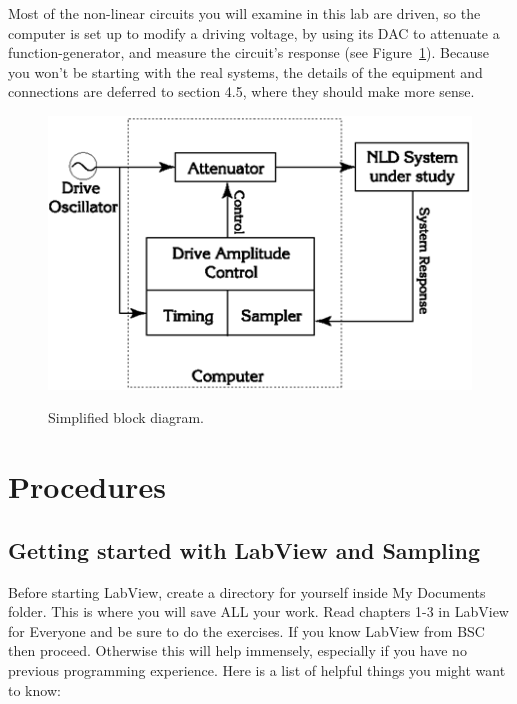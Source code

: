 \documentclass{../lab}
\begin{document}
Most of the non-linear circuits you will examine in this lab are driven, so the computer is set up to modify a driving voltage, by using its DAC to attenuate a function-generator, and measure the circuit's response (see Figure~\ref{fig:SimplifiedBlockDiagram}). Because you won't be starting with the real systems, the details of the equipment and connections are deferred to section 4.5, where they should make more sense.

\begin{figure}[h]
    \centering
    \href{http://experimentationlab.berkeley.edu/sites/default/files/images/Nldimage066.gif}{\includegraphics[width=0.7\linewidth]{images/Nldimage066.png}}
    \caption{Simplified block diagram.}
    \label{fig:SimplifiedBlockDiagram}
\end{figure}

\section{Procedures}

\subsection{Getting started with LabView and Sampling}

Before starting LabView, create a directory for yourself inside My Documents folder. This is where you will save ALL your work. Read chapters 1-3 in LabView for Everyone and be sure to do the exercises. If you know LabView from BSC then proceed. Otherwise this will help immensely, especially if you have no previous programming experience. Here is a list of helpful things you might want to know:
\end{document}
